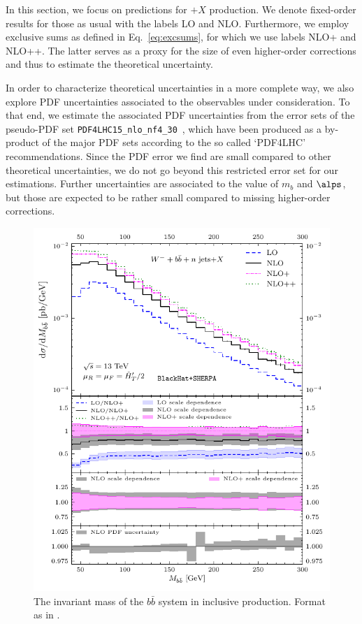 In this section, we focus on predictions for \Wbb$+X$ production. We
denote fixed-order
results for those as usual with the labels LO and
NLO. Furthermore, we employ exclusive sums as defined in
Eq.~\eqref{eq:excsums}, for which we use labels NLO+ and NLO++. The latter serves as a proxy for the size of even
higher-order corrections and thus to estimate the theoretical uncertainty.

In order to characterize theoretical uncertainties in a more complete way, we also explore PDF uncertainties associated to the
observables under consideration. To that end, we estimate the
associated PDF uncertainties from the error sets of the pseudo-PDF set
\texttt{PDF4LHC15\_nlo\_nf4\_30}~\cite{Butterworth:2015oua}, which have been produced as a by-product of the major PDF sets according to the so
called `PDF4LHC' recommendations. Since the PDF error we find are
small compared to
other theoretical uncertainties, we do not go beyond this
restricted error set for our estimations. Further uncertainties are
associated to the value of $m_b$ and $\alps$, but those are expected to
be rather small compared to missing higher-order
corrections.


\begin{figure}[t]
\centering
\includegraphics[clip,scale=1]{plots/excl_mbb_v4}
  \caption{The invariant mass of the $b\bar b$ system in inclusive \Wbbm{} production. Format as in .}
  \label{fig_Wmnjmbb}
\end{figure}

